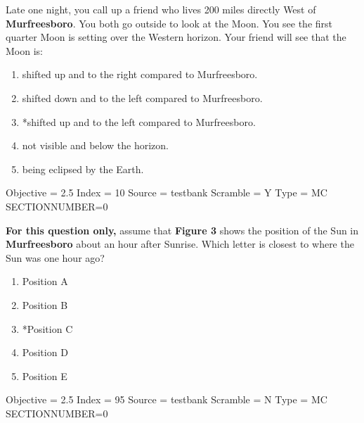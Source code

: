 \documentclass[11pt]{article}
\begin{document}
\begin{enumerate}
\begin{minipage}{\textwidth}
\begin{minipage}{\textwidth}
\item Late one night, you call up a friend who lives 200 miles directly West of {\bf Murfreesboro}.   You both go outside to look at the Moon.   You see the first quarter Moon is setting over the Western horizon.   Your friend will see that the Moon is:
\begin{enumerate} 
\setlength{\itemsep}{1pt} 
\setlength{\parskip}{0pt} 
\setlength{\parsep}{0pt}
\setlength{\multicolsep}{1pt} 
\item shifted  up and to the right compared to Murfreesboro.
\item shifted down and to the left  compared to Murfreesboro.
\item *shifted up and to the left compared to Murfreesboro.
\item not visible and below the horizon.
\item being eclipsed by the Earth.
\end{enumerate} 
Objective = 2.5
Index = 10
Source = testbank
Scramble = Y
Type = MC
SECTIONNUMBER=0
\end{minipage}
\end{minipage}
\vskip 0.20in

\begin{minipage}{\textwidth}
\begin{minipage}{\textwidth}
\item {\bf For this question only,} assume that {\bf Figure 3} shows the position of the Sun in {\bf Murfreesboro} about an hour after Sunrise.   Which letter is closest to where the Sun was one hour ago?
\begin{multicols}{3}
\begin{enumerate} 
\setlength{\itemsep}{1pt} 
\setlength{\parskip}{0pt} 
\setlength{\parsep}{0pt}
\setlength{\multicolsep}{1pt} 
\item Position A
\item Position B
\item *Position C
\item Position D
\item Position E
\end{enumerate} 
\vfill 
\end{multicols}

Objective = 2.5
Index = 95
Source = testbank
Scramble = N
Type = MC
SECTIONNUMBER=0
\end{minipage}
\end{minipage}
\vskip 0.20in


\end{enumerate}
\end{document}
